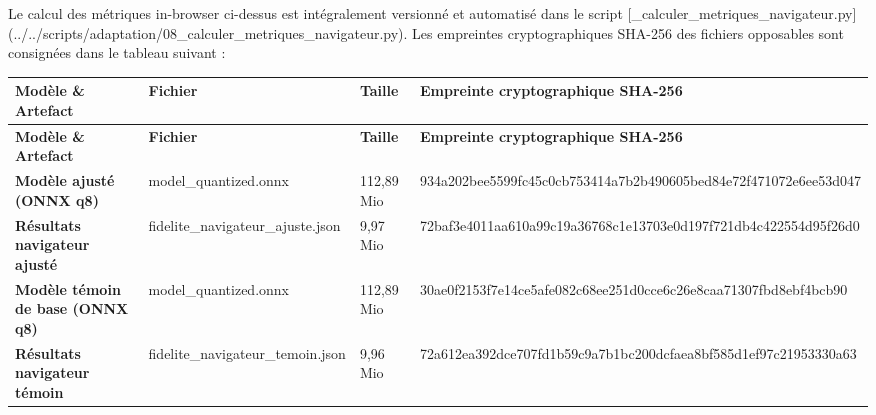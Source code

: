 \documentclass[11pt,a4paper]{article}
\newcommand{\code}[1]  {{\ttfamily #1}}
\newcommand{\thead}[1]{{\tabfont\bfseries\color{accent}\hspace{0pt}#1}}
\newenvironment{tabletype}
  {\par\addvspace{7pt}\begingroup
   \tabfont\setlength{\tabcolsep}{4pt}\renewcommand{\arraystretch}{1.26}
   \setlength{\LTleft}{0pt}\setlength{\LTright}{0pt}
   \setlength{\extrarowheight}{1pt}
   \hyphenpenalty=9000\exhyphenpenalty=9000
   \emergencystretch=0pt\hbadness=10000\relax}
  {\endgroup\par\addvspace{9pt}}
\newlength{\tw}\setlength{\tw}{\textwidth}
\newcommand{\settw}[1]{\setlength{\tw}{\dimexpr\textwidth-#1pt\relax}}
\begin{document}
Le calcul des métriques in-browser ci-dessus est intégralement versionné et automatisé dans le script [\code{08\_\allowbreak{}calculer\_\allowbreak{}metriques\_\allowbreak{}navigateur.\allowbreak{}py}](../../scripts/adaptation/08\_calculer\_metriques\_navigateur.py). Les empreintes cryptographiques SHA-256 des fichiers opposables sont consignées dans le tableau suivant :
\begin{tabletype}
\small
\settw{24.0}
\setlength{\LTpre}{0pt}\setlength{\LTpost}{0pt}
\begin{longtable}{@{}L{0.12619\tw}L{0.12054\tw}L{0.06416\tw}L{0.68912\tw}@{}}
\toprule
\thead{Modèle \& Artefact} & \thead{Fichier} & \thead{Taille} & \thead{Empreinte cryptographique SHA-256} \\
\midrule
\endfirsthead
\toprule
\thead{Modèle \& Artefact} & \thead{Fichier} & \thead{Taille} & \thead{Empreinte cryptographique SHA-256} \\
\midrule
\endhead
\bottomrule
\endfoot
\bottomrule
\endlastfoot
\textbf{Modèle ajusté (ONNX q8)} & \code{model\_\allowbreak{}quantized.\allowbreak{}onnx} & 112,89 Mio & \code{934a202bee5599fc45c0cb753414a7b2b490605bed84e72f471072e6ee53d047} \\
\textbf{Résultats navigateur ajusté} & \code{fidelite\_\allowbreak{}navigateur\_\allowbreak{}ajuste.\allowbreak{}json} & 9,97 Mio & \code{72baf3e4011aa610a99c19a36768c1e13703e0d197f721db4c422554d95f26d0} \\
\textbf{Modèle témoin de base (ONNX q8)} & \code{model\_\allowbreak{}quantized.\allowbreak{}onnx} & 112,89 Mio & \code{30ae0f2153f7e14ce5afe082c68ee251d0cce6c26e8caa71307fbd8ebf4bcb90} \\
\textbf{Résultats navigateur témoin} & \code{fidelite\_\allowbreak{}navigateur\_\allowbreak{}temoin.\allowbreak{}json} & 9,96 Mio & \code{72a612ea392dce707fd1b59c9a7b1bc200dcfaea8bf585d1ef97c21953330a63} \\
\end{longtable}
\end{tabletype}
\end{document}
